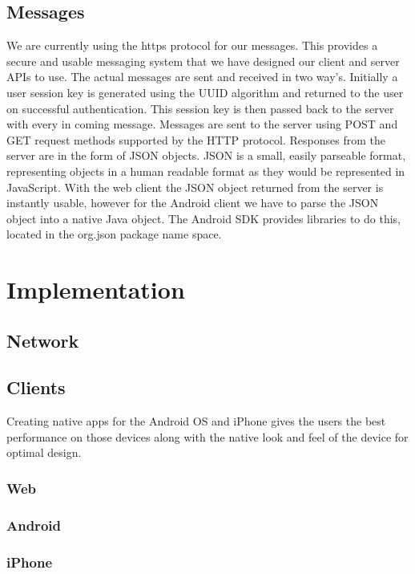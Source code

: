 \documentclass{dependencies/acm_proc_article-sp}
\begin{document}
\subsection{Messages}
We are currently using the https protocol for our messages. This provides a secure
and usable messaging system that we have designed our client and server APIs to use.
The actual messages are sent and received in two way's. Initially a user session key is
generated using the UUID\cite{uuid} algorithm and returned to the user on successful
authentication. This session key is then passed back to the server with every in coming
message. Messages are sent to the server using POST and GET request methods supported
by the HTTP protocol. Responses from the server are in the form of JSON \cite{json} objects.
JSON is a small, easily parseable format, representing objects in a human readable format as
they would be represented in JavaScript. With the web client the JSON object returned from
the server is instantly usable, however for the Android client we have to parse the JSON object
into a native Java object. The Android SDK provides libraries to do this, located in the
org.json \cite{orgjson} package name space.

\section{Implementation}
\subsection{Network}

\subsection{Clients}
Creating native apps for the Android OS and iPhone gives the users the best performance on those devices along with the native look and feel of the device for optimal design.
\subsubsection{Web}

\subsubsection{Android}

\subsubsection{iPhone}
\end{document}

